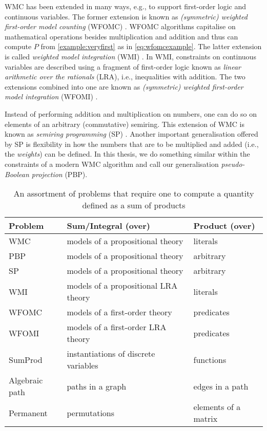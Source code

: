 
WMC has been extended in many ways, e.g., to support first-order logic and continuous variables. The former extension is known as \emph{(symmetric) weighted first-order model counting} (WFOMC) \citep{DBLP:conf/ijcai/BroeckTMDR11}. WFOMC algorithms capitalise on mathematical operations besides multiplication and addition and thus can compute $P$ from \cref{example:veryfirst} as in \cref{eq:wfomcexample}. The latter extension is called \emph{weighted model integration} (WMI) \citep{DBLP:conf/ijcai/BellePB15}. In WMI, constraints on continuous variables are described using a fragment of first-order logic known as \emph{linear arithmetic over the rationals} (LRA), i.e., inequalities with addition. The two extensions combined into one are known as \emph{(symmetric) weighted first-order model integration} (WFOMI) \citep{DBLP:conf/uai/FeldsteinB21}.

Instead of performing addition and multiplication on numbers, one can do so on elements of an arbitrary (commutative) semiring. This extension of WMC is known as \emph{semiring programming} (SP) \citep{DBLP:journals/ijar/BelleR20}. Another important generalisation offered by SP is flexibility in how the numbers that are to be multiplied and added (i.e., the \emph{weights}) can be defined. In this thesis, we do something similar within the constraints of a modern WMC algorithm and call our generalisation \emph{pseudo-Boolean projection} (PBP).

\begin{table}
  \caption{An assortment of problems that require one to compute a quantity defined as a sum of products}
  \label{table:comparison}
  \centering
  \begin{tabular}{lll}
    \toprule
    Problem & Sum/Integral (over) & Product (over) \\
    \midrule
    WMC & models of a propositional theory & literals \\
    PBP & models of a propositional theory & arbitrary \\
    SP & models of a propositional theory & arbitrary \\
    WMI & models of a propositional LRA theory & literals \\
    WFOMC & models of a first-order theory & predicates \\
    WFOMI & models of a first-order LRA theory & predicates \\
    SumProd & instantiations of discrete variables & functions \\
    Algebraic path & paths in a graph & edges in a path \\
    Permanent & permutations & elements of a matrix \\
    \bottomrule
  \end{tabular}
\end{table}

